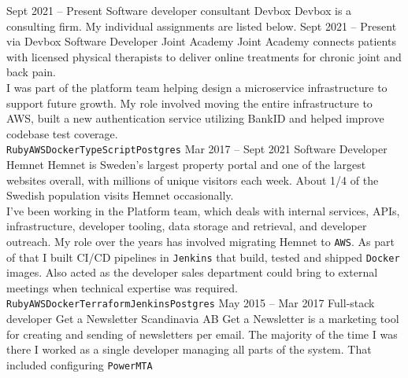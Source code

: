 \documentclass[9pt]{template} %
\begin{document}

\pagebreak
{}

\begin{entrylist}
  \entry
    {Sept 2021 -- Present}
    {Software developer consultant}
    {Devbox}
    {Devbox is a consulting firm. My individual assignments are listed below.}
  \entry
    {Sept 2021 -- Present\\\footnotesize{via Devbox}}
    {Software Developer}
    {Joint Academy}
    {Joint Academy connects patients with licensed physical therapists to deliver
      online treatments for chronic joint and back pain.\\
      I was part of the platform team helping design a microservice infrastructure
      to support future growth. My role involved moving the entire infrastructure
      to AWS, built a new authentication service utilizing BankID and helped improve
      codebase test coverage.\\
      \texttt{Ruby}\slashsep\texttt{AWS}\slashsep\texttt{Docker}\slashsep\texttt{TypeScript}\slashsep\texttt{Postgres}}
  \entry
    {Mar 2017 -- Sept 2021}
    {Software Developer}
    {Hemnet}
    {Hemnet is Sweden's largest property portal and one of the largest websites
      overall, with millions of unique visitors each week. About 1/4 of the
      Swedish population visits Hemnet occasionally.\\ I've been working in the
      Platform team, which deals with internal services, APIs, infrastructure,
      developer tooling, data storage and retrieval, and developer outreach. My
      role over the years has involved migrating Hemnet to \texttt{AWS}.
      As part of that I built CI/CD pipelines in \texttt{Jenkins}
      that build, tested and shipped \texttt{Docker} images.
      Also acted as the developer sales department could bring to external meetings
      when technical expertise was required.\\
      \texttt{Ruby}\slashsep\texttt{AWS}\slashsep\texttt{Docker}\slashsep\texttt{Terraform}\slashsep\texttt{Jenkins}\slashsep\texttt{Postgres}}
  \entry
    {May 2015 -- Mar 2017}
    {Full-stack developer}
    {Get a Newsletter Scandinavia AB}
    {Get a Newsletter is a marketing tool for creating and sending of newsletters
      per email. The majority of the time I was there I worked as a single developer
      managing all parts of the system. That included configuring \texttt{PowerMTA}
}
\end{entrylist}
\end{document}
